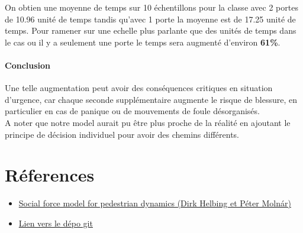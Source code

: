 \documentclass[a4paper,12pt]{article}
\begin{document}
On obtien une moyenne de temps sur 10 échentillons pour la classe avec 2 portes de 10.96 unité de temps tandis qu'avec 1 porte la moyenne est de 17.25 unité de temps. Pour ramener sur une echelle plus parlante que des unités de temps dans le cas ou il y a seulement une porte le temps sera augmenté d'environ \textbf{61\%}. 
\paragraph{Conclusion} Une telle augmentation peut avoir des conséquences critiques en situation d'urgence, car chaque seconde supplémentaire augmente le risque de blessure, en particulier en cas de panique ou de mouvements de foule désorganisés. \\ \indent A noter que notre model aurait pu être plus proche de la réalité en ajoutant le principe de décision individuel pour avoir des chemins différents.

\newpage



\section{Réferences}


\vspace{1em}

\begin{itemize}
	\item \href{https://journals.aps.org/pre/abstract/10.1103/PhysRevE.51.4282}{Social force model for pedestrian dynamics (Dirk Helbing et Péter Molnár)}
	\item \href{https://github.com/antoninnad/etude_des_foules}{Lien vers le dépo git}
\end{itemize}
\end{document}
